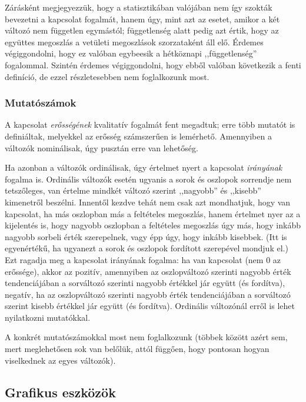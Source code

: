 \documentclass[]{book}
\begin{document}
Zárásként megjegyezzük, hogy a statisztikában valójában nem így szokták bevezetni a kapcsolat fogalmát, hanem úgy, mint azt az esetet, amikor a két változó nem független egymástól; függetlenség alatt pedig azt értik, hogy az együttes megoszlás a vetületi megoszlások szorzataként áll elő. Érdemes végiggondolni, hogy ez valóban egybeesik a hétköznapi ,,függetlenség'' fogalommal. Szintén érdemes végiggondolni, hogy ebből valóban következik a fenti definíció, de ezzel részletesebben nem foglalkozunk most.

\hypertarget{deskriptivminketvaltanalitikusmutatoszamok}{%
\subsubsection{Mutatószámok}\label{deskriptivminketvaltanalitikusmutatoszamok}}

A kapcsolat \emph{erősségének} kvalitatív fogalmát fent megadtuk; erre több mutatót is definiáltak, melyekkel az erősség számszerűen is lemérhető. Amennyiben a változók nominálisak, úgy pusztán erre van lehetőség.

Ha azonban a változók ordinálisak, úgy értelmet nyert a kapcsolat \emph{irányának} fogalma is. Ordinális változók esetén ugyanis a sorok és oszlopok sorrendje nem tetszőleges, van értelme mindkét változó szerint ,,nagyobb'' és ,,kisebb'' kimenetről beszélni. Innentől kezdve tehát nem csak azt mondhatjuk, hogy van kapcsolat, ha más oszlopban más a feltételes megoszlás, hanem értelmet nyer az a kijelentés is, hogy nagyobb oszlopban a feltételes megoszlás úgy más, hogy inkább nagyobb sorbeli érték szerepelnek, vagy épp úgy, hogy inkább kisebbek. (Itt is egyenértékű, ha ugyanezt a sorok és oszlopok fordított szerepével mondjuk el.) Ezt ragadja meg a kapcsolat irányának fogalma: ha van kapcsolat (nem 0 az erőssége), akkor az pozitív, amennyiben az oszlopváltozó szerinti nagyobb érték tendenciájában a sorváltozó szerinti nagyobb értékkel jár együtt (és fordítva), negatív, ha az oszlopváltozó szerinti nagyobb érték tendenciájában a sorváltozó szerint kisebb értékkel jár együtt (és fordítva). Ordinális változónál erről is lehet nyilatkozni mutatókkal.

A konkrét mutatószámokkal most nem foglalkozunk (többek között azért sem, mert meglehetősen sok van belőlük, attól függően, hogy pontosan hogyan viselkednek az egyes változók).

\hypertarget{deskriptivminketvaltgrafikus}{%
\subsection{Grafikus eszközök}\label{deskriptivminketvaltgrafikus}}
\end{document}
